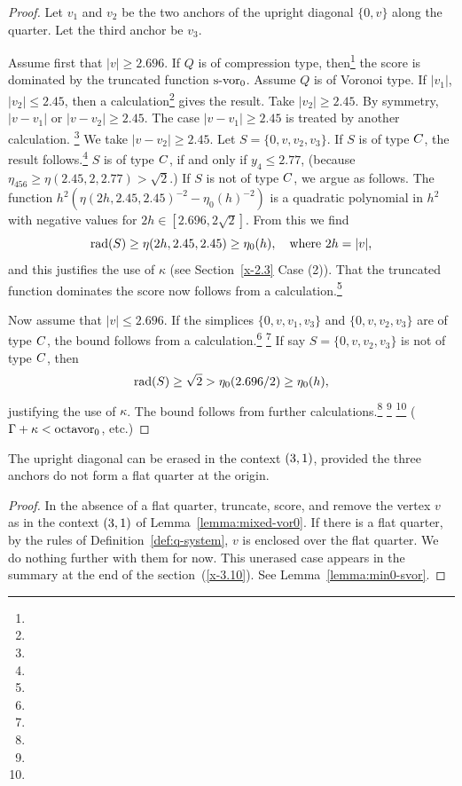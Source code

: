 \begin{proof}
Let $v_1$ and $v_2$ be the two anchors of the upright diagonal $\{0,v\}$
along the quarter. Let the third anchor be $v_3$.

Assume first that $|v|\ge 2.696$. If $Q$ is of compression type,
then\footnote{} %
the score is dominated by the truncated
function $\operatorname{s-vor}_0$.  Assume $Q$ is of Voronoi type. If $|v_1|$,
$|v_2|\le 2.45$, then a calculation\footnote{} %
gives the result. Take $|v_2|\ge
2.45$.  By symmetry, $|v-v_1|$ or $|v-v_2|\ge 2.45$. The case
$|v-v_1|\ge2.45$ is treated by another calculation.%
\footnote{} %
We take
$|v-v_2|\ge2.45$. Let $S=\{0,v,v_2,v_3\}$. If $S$ is of type $C$,
the result follows.\footnote{} %
$S$ is of type $C$, if and only if $y_4\le 2.77$, (because
    $\eta_{456}\ge\eta(2.45,2,2.77)>\sqrt2$.)
If $S$ is  not of type $C$, we argue as follows. The function
$h^2(\eta(2h,2.45,2.45)^{-2}-\eta_0(h)^{-2})$ is a quadratic
polynomial in $h^2$ with negative values for
$2h\in[2.696,2\sqrt{2}]$. From this we find
    $$
    \operatorname{rad}(S)\ge \eta(2h,2.45,2.45) \ge \eta_0(h),\quad\text{where } 2h=|v|,
    $$
and this justifies the use of $\kappa$ (see Section~\ref{x-2.3}
Case (2)). That the truncated function dominates the score now
follows from a calculation.\footnote{} %

Now assume that $|v|\le 2.696$. If the simplices $\{0,v,v_1,v_3\}$
and $\{0,v,v_2,v_3\}$ are of type $C$, the bound follows from a
calculation.\footnote{} %
\footnote{} %
If say  $S=\{0,v,v_2,v_3\}$ is not of type $C$,
then
    $$\operatorname{rad}(S)\ge\sqrt2>  \eta_0(2.696/2)\ge\eta_0(h),$$
justifying the use of $\kappa$. The bound follows from further
calculations.\footnote{} %
\footnote{} %
\footnote{} %
($\Gamma+\kappa <\operatorname{octavor}_0$,
etc.)
\end{proof}

\begin{lemma}
    \label{lemma:unerased}
The upright diagonal can be erased in the context $\relax(3,1)$, provided
the three anchors do not form a flat quarter at the origin.
\end{lemma}

\begin{proof}
In the absence of a flat quarter, truncate, score, and remove the
vertex $v$ as in the context $\relax(3,1)$ of
Lemma~\ref{lemma:mixed-vor0}. If there is a flat quarter, by the
rules of Definition~\ref{def:q-system}, $v$ is enclosed over the
flat quarter. We do nothing further with them for now. This
unerased case appears in the summary at the end of the
section~(\ref{x-3.10}).  See Lemma~\ref{lemma:min0-svor}.
\end{proof}

